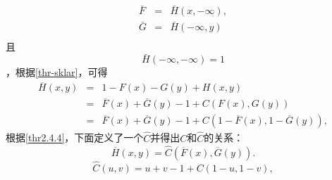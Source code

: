 \begin{eqnarray}
    \bar{F} &=& \bar{H}(x, -\infty), \\
    \bar{G} &=& \bar{H}(-\infty,y) \\
    \label{eq-survivalmarginal}
\end{eqnarray}
且
\begin{equation}
    \bar{H}(-\infty,-\infty) = 1
    \label{eq-survivaljoint}
\end{equation}
，根据\cref{thr-sklar}，可得
\begin{eqnarray*}
    \overline{H}(x,y) &=& 1-F(x)-G(y)+H(x,y) \\
    &=&\overline{F}(x)+\overline{G}(y)-1+C(F(x),G(y)) \\
    &=&\overline{F}(x)+\overline{G}(y)-1+C(1-\overline{F}(x),1-\overline{G}(y)),
\end{eqnarray*}
根据\cref{thr2.4.4}，下面定义了一个$\hat{C}$并得出$C$和$\hat{C}$的关系：
\begin{equation}
    \overline{H}(x,y) = \hat{C}(\overline{F}(x),\overline{G}(y)).
    \label{eq2.6.2}
\end{equation}
\begin{equation}
    \hat{C}(u,v) = u+v-1+C(1-u,1-v),
    \label{eq2.6.1}
\end{equation}

